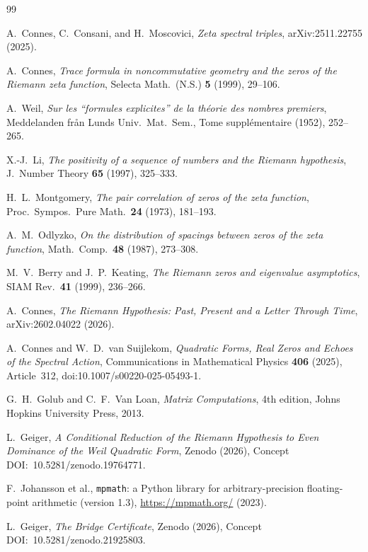 \documentclass[12pt,a4paper]{article}
\theoremstyle{definition}
\theoremstyle{remark}
\begin{document}
\begin{thebibliography}{99}

A.~Connes, C.~Consani, and H.~Moscovici,
\emph{Zeta spectral triples},
arXiv:2511.22755 (2025).

A.~Connes,
\emph{Trace formula in noncommutative geometry and the zeros of the
Riemann zeta function},
Selecta Math.~(N.S.) \textbf{5} (1999), 29--106.

A.~Weil,
\emph{Sur les ``formules explicites'' de la th{\'e}orie des nombres
premiers},
Meddelanden fr{\aa}n Lunds Univ.\ Mat.\ Sem., Tome suppl{\'e}mentaire
(1952), 252--265.

X.-J.~Li,
\emph{The positivity of a sequence of numbers and the Riemann hypothesis},
J.~Number Theory \textbf{65} (1997), 325--333.

H.~L.~Montgomery,
\emph{The pair correlation of zeros of the zeta function},
Proc.\ Sympos.\ Pure Math.\ \textbf{24} (1973), 181--193.

A.~M.~Odlyzko,
\emph{On the distribution of spacings between zeros of the zeta function},
Math.\ Comp.\ \textbf{48} (1987), 273--308.

M.~V.~Berry and J.~P.~Keating,
\emph{The Riemann zeros and eigenvalue asymptotics},
SIAM Rev.\ \textbf{41} (1999), 236--266.

A.~Connes,
\emph{The Riemann Hypothesis: Past, Present and a Letter Through Time},
arXiv:2602.04022 (2026).

A.~Connes and W.~D.~van Suijlekom,
\emph{Quadratic Forms, Real Zeros and Echoes of the Spectral Action},
Communications in Mathematical Physics \textbf{406} (2025), Article~312,
doi:10.1007/s00220-025-05493-1.

G.~H.~Golub and C.~F.~Van Loan,
\emph{Matrix Computations},
4th edition, Johns Hopkins University Press, 2013.

L.~Geiger,
\emph{A Conditional Reduction of the Riemann Hypothesis to Even Dominance of the
Weil Quadratic Form},
Zenodo (2026), Concept DOI:~10.5281/zenodo.19764771.

F.~Johansson et al.,
\texttt{mpmath}: a Python library for arbitrary-precision floating-point
arithmetic (version 1.3),
\url{https://mpmath.org/} (2023).

L.~Geiger,
\emph{The Bridge Certificate},
Zenodo (2026), Concept DOI:~10.5281/zenodo.21925803.


\end{thebibliography}
\end{document}
